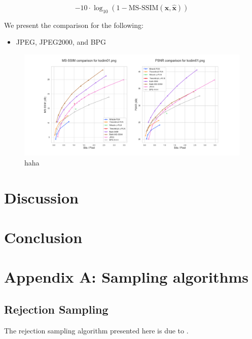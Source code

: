 \documentclass{article}
\renewcommand{\vec}[1]{\mathbf{#1}}
\begin{document}
\begin{equation}
\label{eq:metric_ms_ssim}
-10 \cdot \log_{10}\left( 1 - \text{MS-SSIM}(\vec{x}, \vec{\hat{x}}) \right)
\end{equation}

We present the comparison for the following:
\begin{itemize}
\item JPEG, JPEG2000, and BPG
\end{itemize}

\begin{figure}[H]
  \centering
  \includegraphics[width=\textwidth]{../img/plots/kodak_comparison/kodim01_comparison}
  \caption{haha}
  \label{fig:kodim01_comp}
\end{figure}
\section{Discussion}
\section{Conclusion}

\cite{townsend2019practical}
\printbibliography

\newpage

\section*{Appendix A: Sampling algorithms}
\subsection*{Rejection Sampling}
\par
The rejection sampling algorithm presented here is due to
\cite{harsha2007communication}.
\end{document}
